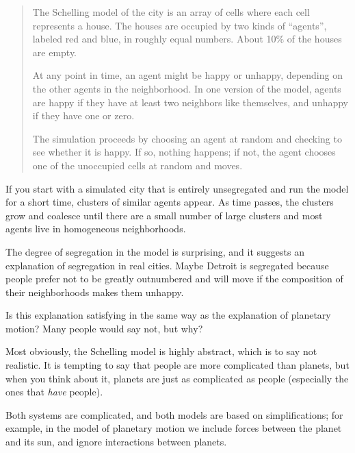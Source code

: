 \documentclass[12pt]{book}
\theoremstyle{exercise}
\begin{document}
\begin{quote}
The Schelling model of the city is an array of cells where each cell
represents a house.  The houses are occupied by two kinds of
``agents'', labeled red and blue, in roughly equal numbers.  About
10\% of the houses are empty.


At any point in time, an agent might be happy or unhappy, depending
on the other agents in the neighborhood.
In one version of the model, agents are happy if they have at least
two neighbors like themselves, and unhappy if they have one or zero.


The simulation proceeds by choosing an agent at random and checking
to see whether it is happy.  If so, nothing happens; if not,
the agent chooses one of the unoccupied cells at
random and moves.
\end{quote}

If you start with a simulated city that is entirely unsegregated and
run the model for a short time, clusters of similar agents appear.  As
time passes, the clusters grow and coalesce until there are a small
number of large clusters and most agents live in homogeneous
neighborhoods.


The degree of segregation in the model is surprising, and it suggests
an explanation of segregation in real cities.  Maybe Detroit is
segregated because people prefer not to be greatly outnumbered and
will move if the composition of their neighborhoods makes them
unhappy.


Is this explanation satisfying in the same way as the explanation of
planetary motion?  Many people would say not, but why?

Most obviously, the Schelling model is highly abstract, which is to
say not realistic.  It is tempting to say that people are more complicated
than planets, but when you think about it, planets are just as complicated
as people (especially the ones that {\em have} people).


Both systems are complicated, and both models are based on
simplifications; for example, in the model of planetary motion we
include forces between the planet and its sun, and ignore interactions
between planets.
\end{document}

